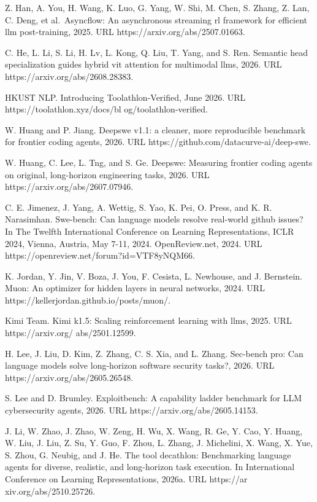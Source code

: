 \documentclass[
  10
]{article}
\begin{document}
Z. Han, A. You, H. Wang, K. Luo, G. Yang, W. Shi, M. Chen, S. Zhang, Z.
Lan, C. Deng, et al.~Asyncflow: An asynchronous streaming rl framework
for efficient llm post-training, 2025. URL
https://arxiv.org/abs/2507.01663.

C. He, L. Li, S. Li, H. Lv, L. Kong, Q. Liu, T. Yang, and S. Ren.
Semantic head specialization guides hybrid vit attention for multimodal
llms, 2026. URL https://arxiv.org/abs/2608.28383.

HKUST NLP. Introducing Toolathlon-Verified, June 2026. URL
https://toolathlon.xyz/docs/bl og/toolathlon-verified.

W. Huang and P. Jiang. Deepswe v1.1: a cleaner, more reproducible
benchmark for frontier coding agents, 2026. URL
https://github.com/datacurve-ai/deep-swe.

W. Huang, C. Lee, L. Tng, and S. Ge. Deepswe: Measuring frontier coding
agents on original, long-horizon engineering tasks, 2026. URL
https://arxiv.org/abs/2607.07946.

C. E. Jimenez, J. Yang, A. Wettig, S. Yao, K. Pei, O. Press, and K. R.
Narasimhan. Swe-bench: Can language models resolve real-world github
issues? In The Twelfth International Conference on Learning
Representations, ICLR 2024, Vienna, Austria, May 7-11, 2024.
OpenReview.net, 2024. URL https://openreview.net/forum?id=VTF8yNQM66.

K. Jordan, Y. Jin, V. Boza, J. You, F. Cesista, L. Newhouse, and J.
Bernstein. Muon: An optimizer for hidden layers in neural networks,
2024. URL https://kellerjordan.github.io/posts/muon/.

Kimi Team. Kimi k1.5: Scaling reinforcement learning with llms, 2025.
URL https://arxiv.org/ abs/2501.12599.

H. Lee, J. Liu, D. Kim, Z. Zhang, C. S. Xia, and L. Zhang. Sec-bench
pro: Can language models solve long-horizon software security tasks?,
2026. URL https://arxiv.org/abs/2605.26548.

S. Lee and D. Brumley. Exploitbench: A capability ladder benchmark for
LLM cybersecurity agents, 2026. URL https://arxiv.org/abs/2605.14153.

J. Li, W. Zhao, J. Zhao, W. Zeng, H. Wu, X. Wang, R. Ge, Y. Cao, Y.
Huang, W. Liu, J. Liu, Z. Su, Y. Guo, F. Zhou, L. Zhang, J. Michelini,
X. Wang, X. Yue, S. Zhou, G. Neubig, and J. He. The tool decathlon:
Benchmarking language agents for diverse, realistic, and long-horizon
task execution. In International Conference on Learning Representations,
2026a. URL https://ar xiv.org/abs/2510.25726.
\end{document}
